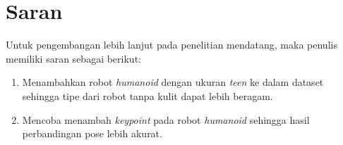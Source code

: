 \section{Saran}
\label{chap:suggestionsandfuturework}

Untuk pengembangan lebih lanjut pada penelitian mendatang, maka penulis memiliki saran sebagai berikut:

\begin{enumerate}[nolistsep]

  \item Menambahkan robot \textit{humanoid} dengan ukuran \textit{teen} ke dalam dataset sehingga tipe dari robot tanpa kulit dapat lebih beragam.
  \item Mencoba menambah \textit{keypoint} pada robot \textit{humanoid} sehingga hasil perbandingan pose lebih akurat.

\end{enumerate}
